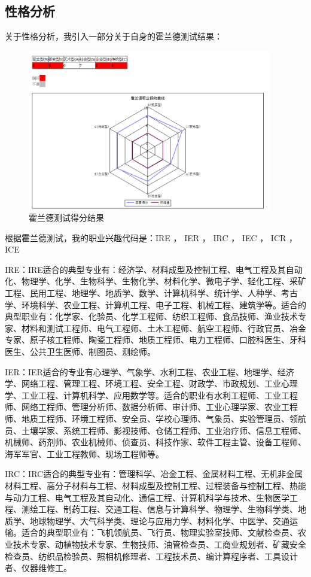 \documentclass{article}
\begin{document}
\subsection{性格分析}
关于性格分析，我引入一部分关于自身的霍兰德测试结果：
\begin{figure}[h!]
\centering
\includegraphics[width=0.95\textwidth]{hld}
\caption{霍兰德测试得分结果}
\label{fig:hld}
\end{figure}
\par
根据霍兰德测试，我的职业兴趣代码是：IRE ， IER ， IRC ， IEC ， ICR ， ICE
\par
IRE：IRE适合的典型专业有：经济学、材料成型及控制工程、电气工程及其自动化、物理学、化学、生物科学、生物化学、材料化学、微电子学、轻化工程、采矿工程、民用工程、地理学、地质学、数学、计算机科学、统计学、人种学、考古学、环境科学、农业工程、计算机工程、电子工程、机械工程、建筑学等。适合的典型职业有：化学家、化验员、化学工程师、纺织工程师、食品技师、渔业技术专家、材料和测试工程师、电气工程师、土木工程师、航空工程师、行政官员、冶金专家、原子核工程师、陶瓷工程师、地质工程师、电力工程师、口腔科医生、牙科医生、公共卫生医师、制图员、测绘师。
\par
IER：IER适合的专业有心理学、气象学、水利工程、农业工程、地理学、经济学、网络工程、管理工程、环境工程、安全工程、财政学、市政规划、工业心理学、工业工程、计算机科学、应用数学等。适合的职业有水利工程师、工业工程师、网络工程师、管理分析师、数据分析师、审计师、工业心理学家、农业工程师、地质工程师、环境工程师、安全员、学校心理师、气象员、实验管理员、领航员、土壤学家、系统工程师、影视技师、仓储工程师、工业治疗师、信息工程师、机械师、药剂师、农业机械师、侦查员、科技作家、软件工程主管、设备工程师、海军军官、工业工程教师、现场工程师等。
\par
IRC：IRC适合的典型专业有：管理科学、冶金工程、金属材料工程、无机非金属材料工程、高分子材料与工程、材料成型及控制工程、过程装备与控制工程、热能与动力工程、电气工程及其自动化、通信工程、计算机科学与技术、生物医学工程、测绘工程、制药工程、交通工程、信息与计算科学、物理学、生物科学类、地质学、地球物理学、大气科学类、理论与应用力学、材料化学、中医学、交通运输。适合的典型职业有：飞机领航员、飞行员、物理实验室技师、文献检查员、农业技术专家、动植物技术专家、生物技师、油管检查员、工商业规划者、矿藏安全检查员、纺织品检验员、照相机修理者、工程技术员、编计算程序者、工具设计者、仪器维修工。
\end{document}
